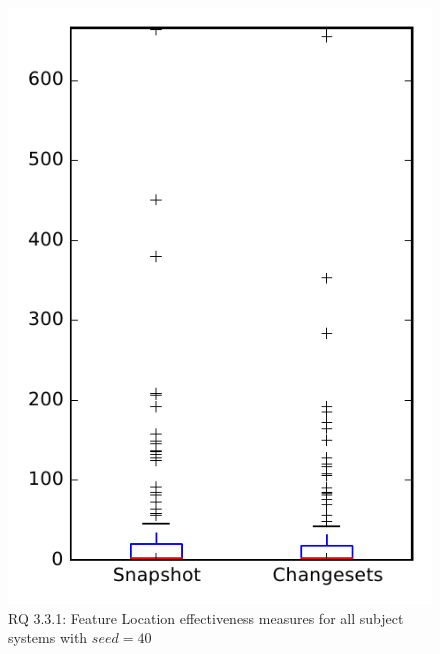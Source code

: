 
\begin{figure}
\centering
\includegraphics[height=0.4\textheight]{figures/flt_seed/rq1_overview_40}
\caption{RQ 3.3.1: Feature Location effectiveness measures for all subject systems with $seed=40$}
\label{fig:flt_seed:rq1:overview}
\end{figure}
